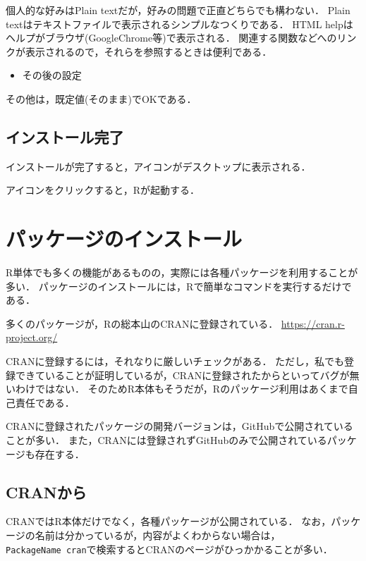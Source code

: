 \documentclass[
]{article}
\providecommand{\tightlist}{%
  \setlength{\itemsep}{0pt}\setlength{\parskip}{0pt}}
\begin{document}
個人的な好みはPlain textだが，好みの問題で正直どちらでも構わない．
Plain textはテキストファイルで表示されるシンプルなつくりである．
HTML helpはヘルプがブラウザ(GoogleChrome等)で表示される．
関連する関数などへのリンクが表示されるので，それらを参照するときは便利である．

\begin{itemize}
\tightlist
\item
  その後の設定
\end{itemize}

その他は，既定値(そのまま)でOKである．

\hypertarget{ux30a4ux30f3ux30b9ux30c8ux30fcux30ebux5b8cux4e86}{%
\subsection{インストール完了}\label{ux30a4ux30f3ux30b9ux30c8ux30fcux30ebux5b8cux4e86}}

インストールが完了すると，アイコンがデスクトップに表示される．

アイコンをクリックすると，Rが起動する．

\hypertarget{package}{%
\section{パッケージのインストール}\label{package}}

R単体でも多くの機能があるものの，実際には各種パッケージを利用することが多い．
パッケージのインストールには，Rで簡単なコマンドを実行するだけである．

多くのパッケージが，Rの総本山のCRANに登録されている．
\url{https://cran.r-project.org/}

CRANに登録するには，それなりに厳しいチェックがある．
ただし，私でも登録できていることが証明しているが，CRANに登録されたからといってバグが無いわけではない．
そのためR本体もそうだが，Rのパッケージ利用はあくまで自己責任である．

CRANに登録されたパッケージの開発バージョンは，GitHubで公開されていることが多い．
また，CRANには登録されずGitHubのみで公開されているパッケージも存在する．

\hypertarget{cran}{%
\subsection{CRANから}\label{cran}}

CRANではR本体だけでなく，各種パッケージが公開されている．
なお，パッケージの名前は分かっているが，内容がよくわからない場合は，\texttt{PackageName\ cran}で検索するとCRANのページがひっかかることが多い．
\end{document}
